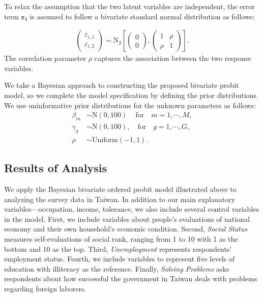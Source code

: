 \documentclass[12pt]{article}
\newcommand{\bpm}{\begin{pmatrix}}
\newcommand{\epm}{\end{pmatrix}}
\begin{document}
To relax the assumption that the two latent variables are independent, the error term $\bm{\varepsilon_{i}}$ is assumed to follow a bivariate standard normal distribution as follows:

\begin{align}
  \bpm \varepsilon_{i,1} \\ \varepsilon_{i,2}  \epm \sim \text{N}_{2} \left[ \bpm 0 \\ 0  \epm, \bpm 1 & \rho \\ \rho & 1 \epm \right].
\end{align} 
The correlation parameter $\rho$ captures the association between the two response variables.


We take a Bayesian approach to constructing the proposed bivariate probit model, so we complete the model specification by defining the prior distributions. We use uninformative prior distributions for the unknown parameters as follows:
\begin{align}
  \beta_{m} &\sim \text{N}(0, 100)\, \quad \text{for} \quad m=1,\cdots ,M, \\
  \gamma_{g} &\sim \text{N}(0, 100), \quad \text{for} \quad g=1,\cdots ,G, \\
  \rho &\sim \text{Uniform}(-1,1).
\end{align} 



\subsection{Results of Analysis}


We apply the Bayesian bivariate ordered probit model illustrated above to analyzing the survey data in Taiwan. In addition to our main explanatory variables---occupation, income, tolerance, we also include several control variables in the model. First, we include variables about people's evaluations of national economy and their own household's economic condition. Second, \textit{Social Status} measures self-evaluations of social rank, ranging from 1 to 10 with 1 as the bottom and 10 as the top. Third, \textit{Unemployment} represents respondents' employment status. Fourth, we include variables to represent five levels of education with illiteracy as the reference. Finally, \textit{Solving Problems} asks respondents about how successful the government in Taiwan deals with problems regarding foreign laborers. 
\end{document}
